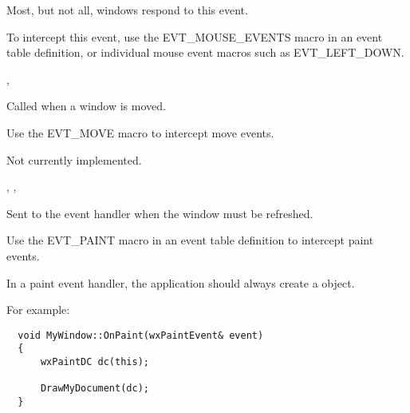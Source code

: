 
Most, but not all, windows respond to this event.

To intercept this event, use the EVT\_MOUSE\_EVENTS macro in an event table definition, or individual
mouse event macros such as EVT\_LEFT\_DOWN.


,\rtfsp
{}

\label{wxwindowonmove}


Called when a window is moved.




Use the EVT\_MOVE macro to intercept move events.


Not currently implemented.


,\rtfsp
{},\rtfsp
{}

\label{wxwindowonpaint}


Sent to the event handler when the window must be refreshed.




Use the EVT\_PAINT macro in an event table definition to intercept paint events.

In a paint event handler, the application should always create a  object.

For example:

\small{%
\begin{verbatim}
  void MyWindow::OnPaint(wxPaintEvent& event)
  {
      wxPaintDC dc(this);

      DrawMyDocument(dc);
  }
\end{verbatim}
}%

